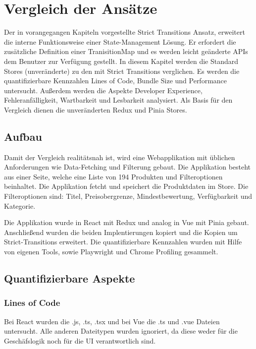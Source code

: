 \chapter{Vergleich der Ansätze} \label{vergleich}

Der in vorangegangen Kapiteln vorgestellte Strict Transitions Ansatz, erweitert die interne Funktionsweise einer State-Management Lösung. Er erfordert die zusätzliche Definition einer TranisitionMap und es werden leicht geänderte APIs dem Benutzer zur Verfügung gestellt. In diesem Kapitel werden die Standard Stores (unveränderte) zu den mit Strict Transitions verglichen. Es werden die quantifizierbare Kennzahlen Lines of Code, Bundle Size und Performance untersucht. Außerdem werden die Aspekte Developer Experience, Fehleranfälligkeit, Wartbarkeit und Lesbarkeit analysiert. Als Basis für den Vergleich dienen die unveränderten Redux und Pinia Stores.

\section{Aufbau}

Damit der Vergleich realitätsnah ist, wird eine Webapplikation mit üblichen Anforderungen wie Data-Fetching und Filterung gebaut. Die Applikation besteht aus einer Seite, welche eine Liste von 194 Produkten und Filteroptionen beinhaltet. Die Applikation fetcht und speichert die Produktdaten im Store. Die Filteroptionen sind: Titel, Preisobergrenze, Mindestbewertung, Verfügbarkeit und Kategorie.

Die Applikation wurde in React mit Redux und analog in Vue mit Pinia gebaut. Anschließend wurden die beiden Implentierungen kopiert und die Kopien um Strict-Transitions erweitert. Die quantifizierbare Kennzahlen wurden mit Hilfe von eigenen Tools, sowie Playwright und Chrome Profiling gesammelt.

\section{Quantifizierbare Aspekte}
\subsection{Lines of Code}

Bei React wurden die .js, .ts, .tsx und bei Vue die .ts und .vue Dateien untersucht. Alle anderen Dateitypen wurden ignoriert, da diese weder für die Geschäfslogik noch für die UI verantwortlich sind.


